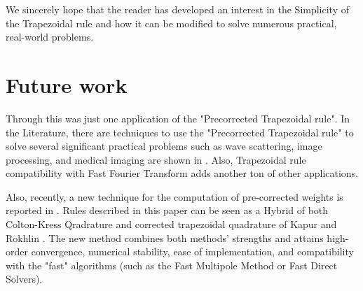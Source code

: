 \documentclass[../document.tex]{subfiles}
\begin{document}
	
	\vspace{10mm}
	
	We sincerely hope that the reader has developed an interest in the Simplicity of the Trapezoidal rule and how it can be modified to solve numerous practical, real-world problems.

	
	\section*{Future work}

	Through this was just one application of the "Precorrected Trapezoidal rule". In the Literature, there are techniques to use the "Precorrected Trapezoidal rule" to solve several significant practical problems such as wave scattering, image processing, and medical imaging are shown in \cite{rokhlin1990rapid,duan2009high,bruno2001fast}.  Also, Trapezoidal rule compatibility with Fast Fourier Transform adds another ton of other applications.
	
	\vspace{6mm}
	
	Also, recently, a new technique for the computation of pre-corrected weights is reported in \cite{wu2020zeta}. Rules described in this paper can be seen as a Hybrid of both Colton-Kress Qradrature \cite{colton1998inverse} and corrected trapezoidal quadrature of Kapur and Rokhlin \cite{kapur1997high}. The new method combines both methods' strengths and attains high-order convergence, numerical stability, ease of implementation, and compatibility with the "fast" algorithms (such as the Fast Multipole Method or Fast Direct Solvers).

	\vspace{6mm}


	

	
	
	
	
	
\end{document}
